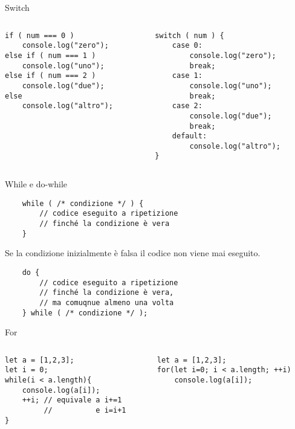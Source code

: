 \begin{frame}[fragile]{Switch}\transfade\centering
  \begin{columns}
    \begin{column}{.5\textwidth}
      \begin{verbatim}
if ( num === 0 )
    console.log("zero");
else if ( num === 1 )
    console.log("uno");
else if ( num === 2 )
    console.log("due");
else
    console.log("altro");
      \end{verbatim}
    \end{column}
    \pause
    \begin{column}{.5\textwidth}
      \begin{verbatim}
switch ( num ) {
    case 0:
        console.log("zero");
        break;
    case 1:
        console.log("uno");
        break;
    case 2:
        console.log("due");
        break;
    default:
        console.log("altro");
}
      \end{verbatim}
    \end{column}
  \end{columns}
\end{frame}

\begin{frame}[fragile]{While e do-while}\transfade\centering
  \begin{verbatim}
    while ( /* condizione */ ) {
        // codice eseguito a ripetizione
        // finché la condizione è vera
    }
  \end{verbatim}
  Se la condizione inizialmente è falsa il codice non viene mai eseguito.
  \pause\bigskip
  \begin{verbatim}
    do {
        // codice eseguito a ripetizione
        // finché la condizione è vera,
        // ma comuqnue almeno una volta
    } while ( /* condizione */ );
  \end{verbatim}
\end{frame}

\begin{frame}[fragile]{For}\transfade\centering
  \begin{columns}
    \begin{column}{.5\textwidth}
      \begin{verbatim}
let a = [1,2,3];
let i = 0;
while(i < a.length){
    console.log(a[i]);
    ++i; // equivale a i+=1
         //          e i=i+1
}
      \end{verbatim}
    \end{column}
    \pause
    \begin{column}{.5\textwidth}
      \begin{verbatim}
let a = [1,2,3];
for(let i=0; i < a.length; ++i)
    console.log(a[i]);
      \end{verbatim}
    \end{column}
  \end{columns}
\end{frame}

